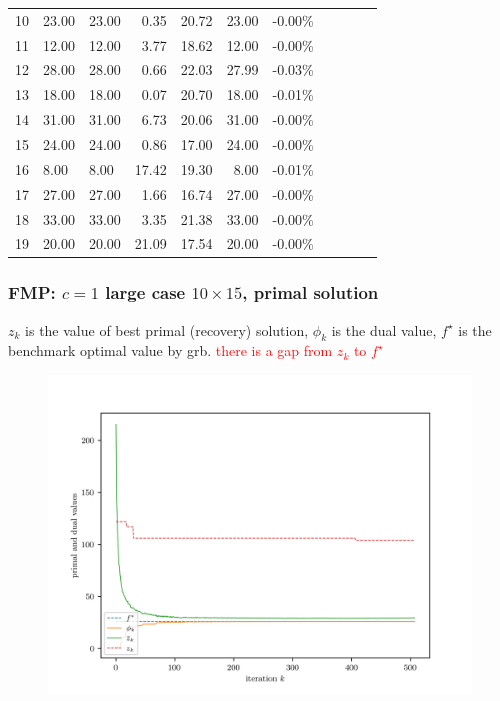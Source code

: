 \begin{frame}
\begin{tabular}{lllrrrlllll}
    10 & 23.00   & 23.00                  & 0.35                    & 20.72 & 23.00 & -0.00\% \\
    11 & 12.00   & 12.00                  & 3.77                    & 18.62 & 12.00 & -0.00\% \\
    12 & 28.00   & 28.00                  & 0.66                    & 22.03 & 27.99 & -0.03\% \\
    13 & 18.00   & 18.00                  & 0.07                    & 20.70 & 18.00 & -0.01\% \\
    14 & 31.00   & 31.00                  & 6.73                    & 20.06 & 31.00 & -0.00\% \\
    15 & 24.00   & 24.00                  & 0.86                    & 17.00 & 24.00 & -0.00\% \\
    16 & 8.00    & 8.00                   & 17.42                   & 19.30 & 8.00  & -0.01\% \\
    17 & 27.00   & 27.00                  & 1.66                    & 16.74 & 27.00 & -0.00\% \\
    18 & 33.00   & 33.00                  & 3.35                    & 21.38 & 33.00 & -0.00\% \\
    19 & 20.00   & 20.00                  & 21.09                   & 17.54 & 20.00 & -0.00\% \\
  \end{tabular}
  \normalsize
\end{frame}

\begin{frame}
  \frametitle{FMP: \(c = 1\) large case \(10\times 15\), primal solution}
  \(z_k\) is the value of best primal (recovery) solution,
  \(\phi_k\) is the dual value, \(f^\star\) is the benchmark optimal value by grb.
  \textcolor{red}{there is a gap from \(z_k\) to \(f^\star\)}
  \begin{figure}

    \includegraphics[width=.89\linewidth]{imgs/conv_0_normal_sg_10_15.png}

    \label{fig:divergent_volume}
  \end{figure}
\end{frame}

